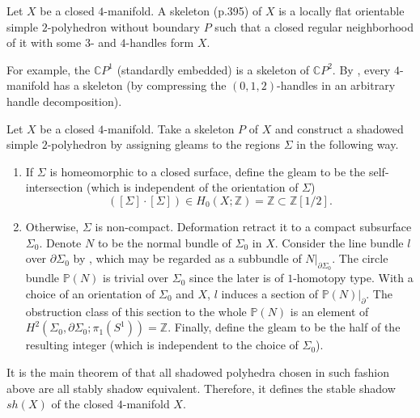 \begin{definition}\label{def/skeleton-of-a-4-manifold}
  Let $X$ be a closed $4$-manifold. A skeleton (p.395) of $X$ is
  a locally flat orientable simple $2$-polyhedron without
  boundary $P$ such that a closed regular neighborhood of it with
  some $3$- and $4$-handles form $X$.
\end{definition}

\noindent For example, the $\mathbb{C}P^{1}$ (standardly
embedded) is a skeleton of $\mathbb{C}P^{2}$. By \cite[theorem
IX.1.5]{turaev-qiok-3-manifolds}, every $4$-manifold has a
skeleton (by compressing the $(0,1,2)$-handles in an arbitrary
handle decomposition).

\begin{definition}\label{def/stable-shadow-of-a-4-manifold}
  Let $X$ be a closed $4$-manifold. Take a skeleton $P$ of $X$
  and construct a shadowed simple $2$-polyhedron by assigning
  gleams to the regions $\Sigma$ in the following way.
  \begin{enumerate}
    \item If $\Sigma$ is homeomorphic to a closed surface, define
          the gleam to be the self-intersection (which is
          independent of the orientation of $\Sigma$)
          $$([\Sigma] \cdot [\Sigma]) \in H_{0}(X;\mathbb{Z}) = \mathbb{Z} \subset \mathbb{Z}\left[1/2\right].$$
    \item Otherwise, $\Sigma$ is non-compact. Deformation retract
          it to a compact subsurface $\Sigma_{0}$. Denote $N$ to
          be the normal bundle of $\Sigma_{0}$ in $X$. Consider
          the line bundle $l$ over $\partial \Sigma_{0}$ by
          \cite[section VIII.6.2,
          p.397]{turaev-qiok-3-manifolds}, which may be regarded
          as a subbundle of $N|_{\partial \Sigma_{0}}$. The
          circle bundle $\mathbb{P}(N)$ is trivial over
          $\Sigma_{0}$ since the later is of $1$-homotopy type.
          With a choice of an orientation of $\Sigma_{0}$ and
          $X$, $l$ induces a section of
          $\mathbb{P}(N)|_{\partial}$. The obstruction class of
          this section to the whole $\mathbb{P}(N)$ is an element
          of
          $H^{2}(\Sigma_{0}, \partial \Sigma_{0}; \pi_{1}(S^{1})) = \mathbb{Z}$.
          Finally, define the gleam to be the half of the
          resulting integer (which is independent to the choice
          of $\Sigma_{0}$).
  \end{enumerate}
  It is the main theorem of \cite[section
  IX.1.7]{turaev-qiok-3-manifolds} that all shadowed polyhedra
  chosen in such fashion above are all stably shadow equivalent.
  Therefore, it defines the stable shadow $sh(X)$ of the closed
  $4$-manifold $X$.
\end{definition}

